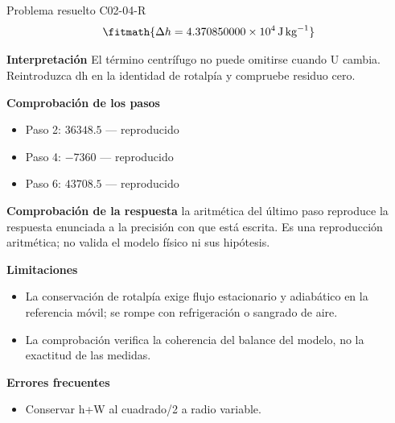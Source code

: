 \documentclass[10pt,openany]{book}
\begin{document}
\begin{studiumworked}{Problema resuelto C02-04-R}
\[
\fitmath{\Delta h=4.370850000\times10^{4}\,\mathrm{J}\,\mathrm{kg}^{-1}}
\]

\noindent\textbf{Interpretación}
El término centrífugo no puede omitirse cuando U cambia. Reintroduzca dh en la identidad de rotalpía y compruebe residuo cero.

\noindent\textbf{Comprobación de los pasos}
\begin{itemize}
\item Paso 2: $36348.5$ — reproducido
\item Paso 4: $-7360$ — reproducido
\item Paso 6: $43708.5$ — reproducido
\end{itemize}

\noindent\textbf{Comprobación de la respuesta} la aritmética del último paso reproduce la respuesta enunciada a la precisión con que está escrita. Es una reproducción aritmética; no valida el modelo físico ni sus hipótesis.

\noindent\textbf{Limitaciones}
\begin{itemize}
\item La conservación de rotalpía exige flujo estacionario y adiabático en la referencia móvil; se rompe con refrigeración o sangrado de aire.
\item La comprobación verifica la coherencia del balance del modelo, no la exactitud de las medidas.
\end{itemize}

\noindent\textbf{Errores frecuentes}
\begin{itemize}
\item Conservar h+W al cuadrado/2 a radio variable.
\end{itemize}
\end{studiumworked}
\end{document}
